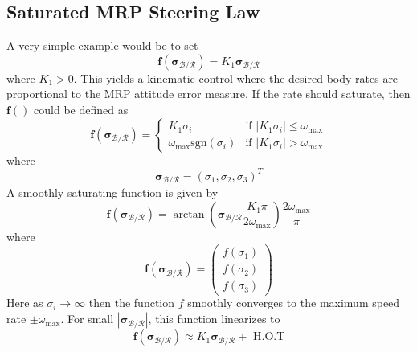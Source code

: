 \documentclass[]{AVSSimReportMemo}
\begin{document}
\subsection{Saturated  MRP Steering Law}
A very simple example would be to set
\begin{equation}
	\label{eq:MS:13}
	\bm f (\bm \sigma_{\mathcal{B}/\mathcal{R}}) =  K_{1} \bm \sigma_{\mathcal{B}/\mathcal{R}}
\end{equation}
where $K_{1}>0$.  
This yields a kinematic control where the desired body rates are proportional to the MRP attitude error measure.  If the rate should saturate, then $\bm f()$ could be defined as
\begin{equation}
	\label{eq:MS:14}
	\bm f(\bm \sigma_{\mathcal{B}/\mathcal{R}}) = \begin{cases}
		K_{1} \sigma_{i} 		&\text{if } |K_{1} \sigma_{i}| \le \omega_{\text{max}} \\
		\omega_{\text{max}} \text{sgn}(\sigma_{i}) &\text{if } |K_{1} \sigma_{i}| > \omega_{\text{max}}
	\end{cases}
\end{equation}
where
$$
	\bm\sigma_{\mathcal{B}/\mathcal{R}} = (\sigma_{1}, \sigma_{2}, \sigma_{3})^{T}
$$
A smoothly saturating function is given by
\begin{equation}
	\label{eq:MS:15}
	\bm f(\bm \sigma_{\mathcal{B}/\mathcal{R}}) = \arctan \left(
		\bm \sigma_{\mathcal{B}/\mathcal{R}} \frac{K_{1} \pi}{2  \omega_{\text{max}}}
	\right) \frac{2 \omega_{\text{max}}}{\pi}
\end{equation}
where
\begin{equation}
	\label{eq:MS:15.0}
	\bm f(\bm\sigma_{\mathcal{B}/\mathcal{R}}) = \begin{pmatrix}
		f(\sigma_{1})\\ f(\sigma_{2})\\ f(\sigma_{3})
		\end{pmatrix}
\end{equation}
Here as $\sigma_{i} \rightarrow \infty$ then the function $f$ smoothly converges to the maximum speed rate $\pm  \omega_{\text{max}}$.   For small $|\bm \sigma_{\mathcal{B}/\mathcal{R}}|$, this function linearizes to
\begin{equation}
	\bm f(\bm \sigma_{\mathcal{B}/\mathcal{R}}) \approx K_{1} \bm \sigma_{\mathcal{B}/\mathcal{R}} + \text{ H.O.T}
\end{equation}
\end{document}
